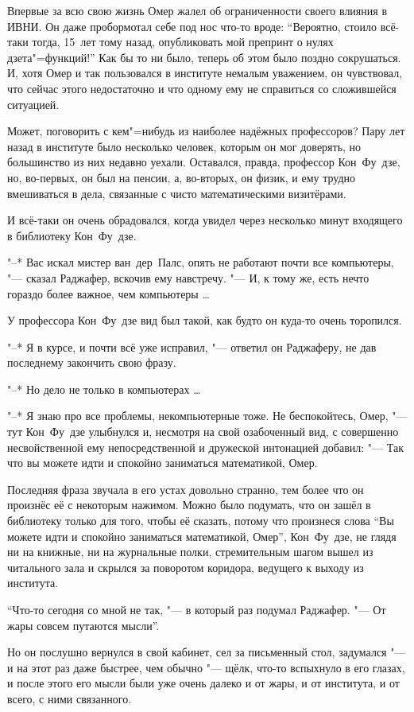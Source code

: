 Впервые за всю свою жизнь Омер жалел об ограниченности своего влияния в ИВНИ.
Он даже пробормотал себе под нос что-то вроде: \enquote{Вероятно, стоило всё-таки
тогда, 15~лет тому назад, опубликовать мой препринт о нулях дзета"=функций!}
Как бы то ни было, теперь об этом было поздно сокрушаться.
И, хотя Омер и так пользовался в институте немалым уважением, он чувствовал,
что сейчас этого недостаточно и что одному ему не справиться со сложившейся
ситуацией.

Может, поговорить с кем"=нибудь из наиболее надёжных профессоров?
Пару лет назад в институте было несколько человек, которым он мог доверять, но
большинство из них недавно уехали.
Оставался, правда, профессор Кон~Фу~дзе, но, во-первых, он был на пенсии, а,
во-вторых, он физик, и ему трудно вмешиваться в дела, связанные с чисто
математическими визитёрами.

И всё-таки он очень обрадовался, когда увидел через несколько минут входящего в
библиотеку Кон~Фу~дзе.

"--* Вас искал мистер ван~дер~Палс, опять не работают почти все компьютеры,
"--- сказал Раджафер, вскочив ему навстречу.
"--- И, к тому же, есть нечто гораздо более важное, чем компьютеры \ldots

У профессора Кон~Фу~дзе вид был такой, как будто он куда-то очень торопился.

"--* Я в курсе, и почти всё уже исправил, "--- ответил он Раджаферу, не дав
последнему закончить свою фразу.

"--* Но дело не только в компьютерах \ldots

"--* Я знаю про все проблемы, некомпьютерные тоже.
Не беспокойтесь, Омер, "--- тут Кон~Фу~дзе улыбнулся и, несмотря на свой
озабоченный вид, с совершенно несвойственной ему непосредственной и дружеской
интонацией добавил: "--- Так что вы можете идти и спокойно заниматься
математикой, Омер.

Последняя фраза звучала в его устах довольно странно, тем более что он произнёс
её с некоторым нажимом. Можно было подумать, что он зашёл в библиотеку только
для того, чтобы её сказать, потому что произнеся слова \enquote{Вы можете идти и
спокойно заниматься математикой, Омер}, Кон~Фу~дзе, не глядя ни на книжные, ни
на журнальные полки, стремительным шагом вышел из читального зала и скрылся за
поворотом коридора, ведущего к выходу из института.

\enquote{Что-то сегодня со мной не так, "--- в который раз подумал Раджафер.
"--- От жары совсем путаются мысли}.

Но он послушно вернулся в свой кабинет, сел за письменный стол, задумался "---
и на этот раз даже быстрее, чем обычно "--- щёлк, что-то вспыхнуло в его глазах,
и после этого его мысли были уже очень далеко и от жары, и от института, и от
всего, с ними связанного.

